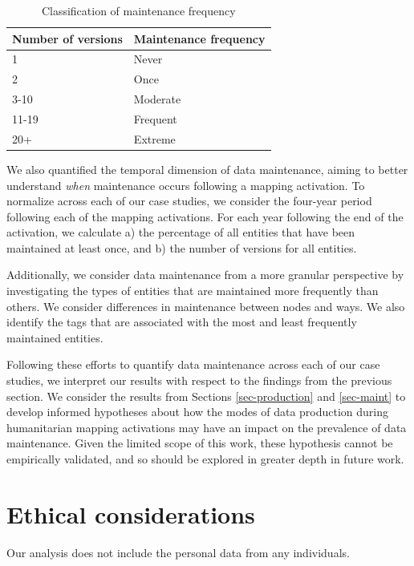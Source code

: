 \begin{table}[]
\centering
\caption{Classification of maintenance frequency}
\label{tab:freq}
\begin{tabular}{ll}
\toprule
Number of versions & Maintenance frequency \\
\midrule
1                  & Never                  \\
2                  & Once                  \\
3-10               & Moderate              \\
11-19              & Frequent              \\
20+                & Extreme               \\
\bottomrule
\end{tabular}
\end{table}

We also quantified the temporal dimension of data maintenance, aiming to better understand \textit{when} maintenance occurs following a mapping activation. To normalize across each of our case studies, we consider the four-year period following each of the mapping activations. For each year following the end of the activation, we calculate a) the percentage of all entities that have been maintained at least once, and b) the number of versions for all entities. 

Additionally, we consider data maintenance from a more granular perspective by investigating the types of entities that are maintained more frequently than others. We consider differences in maintenance between nodes and ways. We also identify the tags that are associated with the most and least frequently maintained entities. 

Following these efforts to quantify data maintenance across each of our case studies, we interpret our results with respect to the findings from the previous section. We consider the results from Sections \ref{sec-production} and \ref{sec-maint} to develop informed hypotheses about how the modes of data production during humanitarian mapping activations may have an impact on the prevalence of data maintenance. Given the limited scope of this work, these hypothesis cannot be empirically validated, and so should be explored in greater depth in future work. 

\section{Ethical considerations}

Our analysis does not include the personal data from any individuals. 

